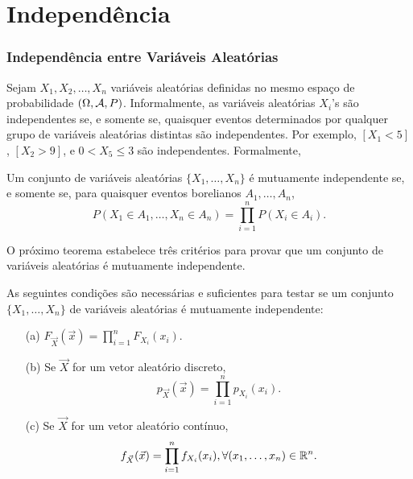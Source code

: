 \section{Independência}
\begin{frame}
\frametitle{\textbf{Independência entre Variáveis Aleatórias}}
Sejam $X_1,X_2,\ldots,X_n$ variáveis aleatórias definidas no mesmo espaço de probabilidade $(\Omega,{\cal A},P)$. Informalmente, as variáveis aleatórias $X_i$'s são independentes se, e somente se, quaisquer eventos determinados por qualquer grupo de variáveis aleatórias distintas são independentes. Por exemplo, $[X_1<5]$, $[X_2>9]$, e $0<X_5\leq 3$ são independentes. Formalmente,
%
\begin{defi}
Um conjunto de variáveis aleatórias $\{X_1,\ldots,X_n\}$
é mutuamente independente se, e somente se, para quaisquer eventos
borelianos $A_1,\ldots,A_n$,
$$P(X_1\in A_1,\ldots,X_n\in A_n)=\prod_{i=1}^{n}P(X_i\in A_i).$$
\end{defi}

O próximo teorema estabelece três critérios para provar
que um conjunto de variáveis aleatórias é mutuamente independente.
\end{frame}


\begin{frame}
\begin{teo} As seguintes condições são necessárias e suficientes para
testar se um conjunto $\{X_1,\ldots,X_n\}$ de variáveis aleatórias é
mutuamente independente:
\begin{enumerate}
\item[(a)] $F_{\vec{X}}(\vec{x})=\prod_{i=1}^{n}F_{X_i}(x_i)$.

\item[(b)] Se $\vec{X}$ for um vetor aleatório discreto,
$$p_{\vec{X}}(\vec{x})=\prod_{i=1}^{n}p_{X_i}(x_i).$$

\item[(c)] Se $\vec{X}$ for um vetor aleatório contínuo,
$$f_{\vec{X}}(\vec{x})=\prod_{i=1}^{n}f_{X_i}(x_i),\forall(x_1,\ldots,x_n)\in\mathbb{R}^n.$$
\end{enumerate}
\end{teo}
\end{frame}

